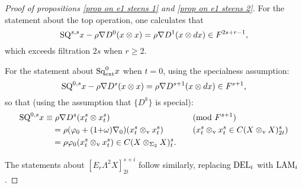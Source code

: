 \documentclass[11pt]{amsart} \renewcommand{\baselinestretch}{1.2}
\theoremstyle{plain}
\newtheorem{prop}[thm]{Proposition}
\numberwithin{equation}{section} %
\theoremstyle{plain}
\newtheorem{prop}[thm]{Proposition}
\numberwithin{equation}{chapter} %
\let\oldphi\phi
\let\phi\varphi
\renewcommand{\to}{\longrightarrow}
\newcommand{\twist}{\omega}
\newcommand{\Nabla}{\nabla}
\newcommand{\Sq}{\mathrm{Sq}}
\newcommand{\Edownup}[5]{[E_{#1}^{#2}#3]^{#4}_{#5}}
\newcommand{\dver}{_\mathrm{v}}
\renewcommand{\mapsto}{\longmapsto}
\begin{document}
\begin{second quadrant homotopy sseq operations}
\begin{proof}[Proof of propositions \ref{prop on e1 steens 1} and \ref{prop on e1 steens 2}]
For the statement about the top operation, one calculates that
\[\textup{SQ}^{s,s}x-\rho\Nabla D^0(x\otimes x)=\rho\nabla D^{1}(x\otimes dx)\in F^{2s+r-1},\] which exceeds filtration $2s$ when $r\geq2$.



For the statement about $\Sq_\textup{ext}^0x$ when $t=0$, using the specialness assumption:
\[\textup{SQ}^{0,s}x-\rho\Nabla D^s(x\otimes x)=\rho\Nabla D^{s+1}(x\otimes dx) \in F^{s+1},\]
so that (using the assumption that $\{D^k\}$ is special):
\begin{alignat*}{2}
\textup{SQ}^{0,s}x
&\equiv
\rho\Nabla D^s(x^s_t\otimes x^s_t)&&\textup{(mod $F^{s+1}$)}%
\\
&\quad =
\rho(\oldphi_0+(1{+}\twist)\Nabla_0)(x^s_t\otimes\dver x^s_t)%
&\quad&\text{($x^s_t\otimes\dver x^s_t\in C(X\otimes\dver X)_{2t}^{s}$)}\\
&\quad =
\rho\oldphi_0(x^s_t\otimes\dver x^s_t)\in C(X\otimes_{\Sigma_2} X)_{t}^{s}.
\end{alignat*}

The statements about $\Edownup{r}{}{\Lambda^2X}{s+i}{2t}$ follow similarly, replacing  $\textup{DEL}_i$ with $\textup{LAM}_i$.\end{proof}


\end{second quadrant homotopy sseq operations}
\end{document}

